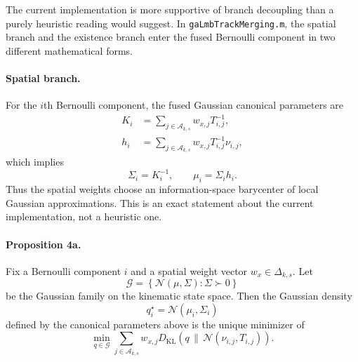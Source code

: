 The current implementation is more supportive of branch decoupling than a purely heuristic reading would suggest. In \texttt{gaLmbTrackMerging.m}, the spatial branch and the existence branch enter the fused Bernoulli component in two different mathematical forms.

\paragraph{Spatial branch.}
For the $i$th Bernoulli component, the fused Gaussian canonical parameters are
\begin{align}
K_i &= \sum_{j \in \mathcal{A}_{k,s}} w_{x,j} T_{i,j}^{-1}, \\
h_i &= \sum_{j \in \mathcal{A}_{k,s}} w_{x,j} T_{i,j}^{-1}\nu_{i,j},
\end{align}
which implies
\begin{equation}
\Sigma_i = K_i^{-1},
\qquad
\mu_i = \Sigma_i h_i.
\end{equation}
Thus the spatial weights choose an information-space barycenter of local Gaussian approximations. This is an exact statement about the current implementation, not a heuristic one.

\paragraph{Proposition 4a.}
Fix a Bernoulli component $i$ and a spatial weight vector $w_x \in \Delta_{k,s}$. Let
\begin{equation}
\mathcal{G} = \left\{\mathcal{N}(\mu,\Sigma) : \Sigma \succ 0\right\}
\end{equation}
be the Gaussian family on the kinematic state space. Then the Gaussian density
\begin{equation}
q_i^\star = \mathcal{N}(\mu_i,\Sigma_i)
\end{equation}
defined by the canonical parameters above is the unique minimizer of
\begin{equation}
\min_{q \in \mathcal{G}}
\sum_{j \in \mathcal{A}_{k,s}} w_{x,j}
D_{\mathrm{KL}}\!\left(q \,\|\, \mathcal{N}(\nu_{i,j},T_{i,j})\right).
\label{eq:gaussian-kla-barycenter}
\end{equation}

